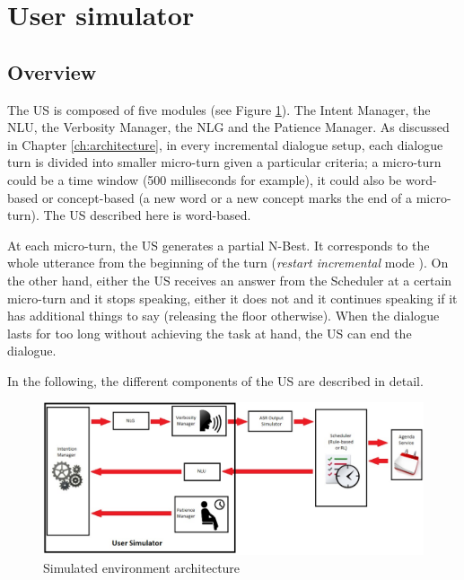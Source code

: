     
\section{User simulator}
	\subsection{Overview}
    
    	The US is composed of five modules (see Figure \ref{fig:archi}). The Intent Manager, the NLU, the Verbosity Manager, the NLG and the Patience Manager. As discussed in Chapter \ref{ch:architecture}, in every incremental dialogue setup, each dialogue turn is divided into smaller micro-turn given a particular criteria; a micro-turn could be a time window (500 milliseconds for example), it could also be word-based or concept-based (a new word or a new concept marks the end of a micro-turn). The US described here is word-based.
        
        At each micro-turn, the US generates a partial N-Best. It corresponds to the whole utterance from the beginning of the turn (\textit{restart incremental} mode \cite{Schlangen2011}). On the other hand, either the US receives an answer from the Scheduler at a certain micro-turn and it stops speaking, either it does not and it continues speaking if it has additional things to say (releasing the floor otherwise). When the dialogue lasts for too long without achieving the task at hand, the US can end the dialogue.
        
        In the following, the different components of the US are described in detail.
        
        \begin{figure}[htb]
          \centering
          \includegraphics[scale=0.45]{figures/ArchiSimuSys.pdf}
          \caption{Simulated environment architecture}
          \label{fig:archi}
        \end{figure}
    
